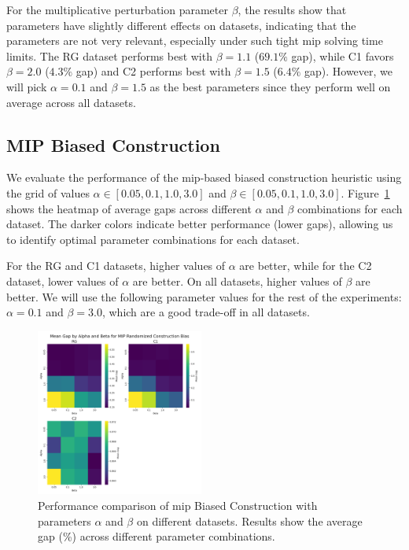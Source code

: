 \documentclass[twocolumn, switch]{article} %
\begin{document}
For the multiplicative perturbation parameter $\beta$, the results show that parameters have slightly different effects on datasets, indicating that the parameters are not very relevant, especially under such tight \gls{mip} solving time limits. The RG dataset performs best with $\beta = 1.1$ ($69.1\%$ gap), while C1 favors $\beta = 2.0$ ($4.3\%$ gap) and C2 performs best with $\beta = 1.5$ ($6.4\%$ gap). However, we will pick $\alpha = 0.1$ and $\beta = 1.5$ as the best parameters since they perform well on average across all datasets.


\subsection{MIP Biased Construction}

We evaluate the performance of the \gls{mip}-based biased construction heuristic
using the grid of values $\alpha \in [0.05, 0.1, 1.0, 3.0]$ and $\beta \in [0.05, 0.1, 1.0, 3.0]$.
Figure~\ref{fig:alpha_beta_grid_mip_randomized_construction_bias} shows the heatmap of average gaps across different $\alpha$ and $\beta$ combinations for each dataset.
The darker colors indicate better performance (lower gaps), allowing us to identify optimal parameter combinations for each dataset. 

For the RG and C1 datasets, higher values of $\alpha$ are better, while for the C2 dataset, lower values of $\alpha$ are better.
On all datasets, higher values of $\beta$ are better.
We will use the following parameter values for the rest of the experiments: $\alpha = 0.1$ and $\beta = 3.0$, which are a good trade-off in all datasets.

\begin{figure}[h]
    \centering
    \includegraphics[width=0.49\textwidth]{figures/alpha_beta_grid_mip_randomized_construction_bias.png}
    \caption{Performance comparison of \gls{mip} Biased Construction with parameters $\alpha$ and $\beta$ on different datasets. Results show the average gap (\%) across different parameter combinations.}
    \label{fig:alpha_beta_grid_mip_randomized_construction_bias} 
\end{figure} 
\end{document}
